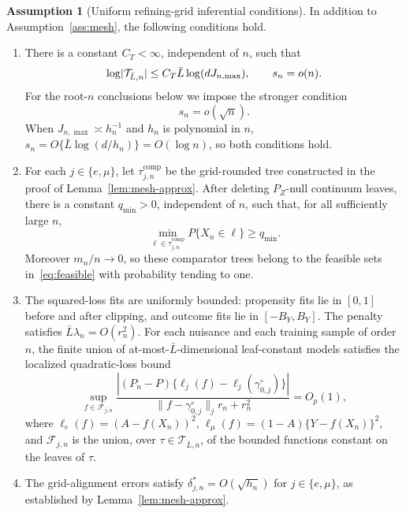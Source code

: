 \documentclass[11pt]{article}
\theoremstyle{plain}
\theoremstyle{definition}
\newtheorem{assumption}{Assumption}
\theoremstyle{remark}
\newcommand{\cT}{\mathcal{T}}
\DeclarePairedDelimiter{\card}{\lvert}{\rvert}
\begin{document}
\begin{assumption}[Uniform refining-grid inferential conditions]
\label{ass:grid-inference}
In addition to Assumption~\ref{ass:mesh}, the following conditions hold.

\begin{enumerate}[label=(U\arabic*),leftmargin=*]

\item\label{u:entropy}
There is a constant $C_T<\infty$, independent of $n$, such that
\[
  \log\card{\cT_{\bar L,n}}
  \le C_T\bar L\log(dJ_{n,\max}),
  \qquad
  s_n=o(n).
\]
For the root-$n$ conclusions below we impose the stronger condition
\[
  s_n=o(\sqrt n).
  \tag{U1$^+$}\label{eq:u1plus}
\]
When $J_{n,\max}\asymp h_n^{-1}$ and $h_n$ is polynomial in $n$,
$s_n=O\{\bar L\log(d/h_n)\}=O(\log n)$, so both conditions hold.

\item\label{u:comparator}
For each $j\in\{e,\mu\}$, let $\tau^{\mathrm{comp}}_{j,n}$ be the
grid-rounded tree constructed in the proof of
Lemma~\ref{lem:mesh-approx}. After deleting $P_Z$-null continuum leaves,
there is a constant $q_{\min}>0$, independent of $n$, such that, for all
sufficiently large $n$,
\[
  \min_{\ell\in\tau^{\mathrm{comp}}_{j,n}}P\{X_n\in\ell\}\ge q_{\min}.
\]
Moreover $m_n/n\to0$, so these comparator trees belong to the feasible sets
in~\eqref{eq:feasible} with probability tending to one.

\item\label{u:bernstein}
The squared-loss fits are uniformly bounded: propensity fits lie in $[0,1]$
before and after clipping, and outcome fits lie in $[-B_Y,B_Y]$. The
penalty satisfies $\bar L\lambda_n=O(r_n^2)$. For each nuisance and each
training sample of order $n$, the finite union of at-most-$\bar
L$-dimensional leaf-constant models satisfies the localized quadratic-loss
bound
\begin{equation}\label{eq:grid-bernstein}
 \sup_{f\in\mathcal F_{j,n}}
 \frac{\left|(P_n-P)\{\ell_j(f)-\ell_j(\gamma_{0,j}^\circ)\}\right|}
      {\|f-\gamma_{0,j}^\circ\|_j r_n+r_n^2}
 =O_p(1),
\end{equation}
where $\ell_e(f)=(A-f(X_n))^2$, $\ell_\mu(f)=(1-A)\{Y-f(X_n)\}^2$, and
$\mathcal F_{j,n}$ is the union, over $\tau\in\cT_{\bar L,n}$, of the
bounded functions constant on the leaves of $\tau$.

\item\label{u:approx}
The grid-alignment errors satisfy $\delta^*_{j,n}=O(\sqrt{h_n})$ for
$j\in\{e,\mu\}$, as established by Lemma~\ref{lem:mesh-approx}.

\end{enumerate}
\end{assumption}
\end{document}
